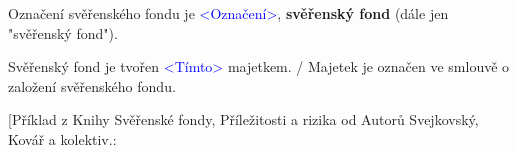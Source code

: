 \documentclass[parskip=half]{scrreprt}
\begin{document}
\begin{contract}





Označení svěřenského fondu je \textcolor{blue}{<Označení>}, \textbf{svěřenský fond} (dále jen "svěřenský fond").


Svěřenský fond je tvořen \textcolor{blue}{<Tímto>} majetkem. / Majetek je označen ve smlouvě o založení svěřenského fondu.

\parnumberfalse
[Příklad z Knihy Svěřenské fondy, Příležitosti a rizika od Autorů Svejkovský, Kovář a kolektiv.: \\


\end{contract}
\end{document}
